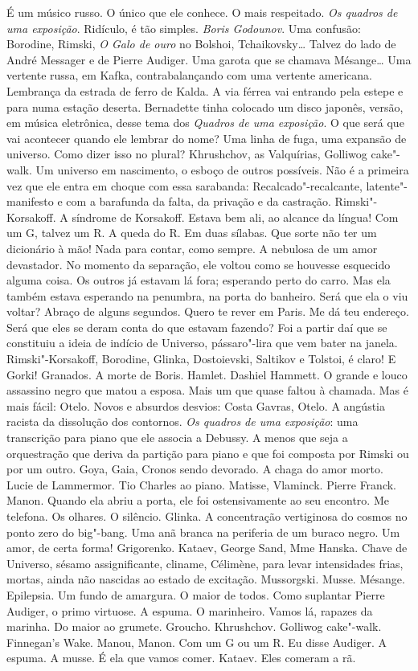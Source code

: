 É um músico russo. O único que ele conhece. O mais respeitado. \emph{Os
quadros de uma exposição}. Ridículo, é tão simples. \emph{Boris
Godounov}. Uma confusão: Borodine, Rimski, \emph{O Galo de ouro} no
Bolshoi, Tchaikovsky\ldots{} Talvez do lado de André Messager e de Pierre
Audiger. Uma garota que se chamava Mésange\ldots{} Uma vertente russa, em
Kafka, contrabalançando com uma vertente americana. Lembrança da estrada
de ferro de Kalda. A via férrea vai entrando pela estepe e para numa
estação deserta. Bernadette tinha colocado um disco japonês, versão, em
música eletrônica, desse tema dos \emph{Quadros de uma exposição}. O que
será que vai acontecer quando ele lembrar do nome? Uma linha de fuga,
uma expansão de universo. Como dizer isso no plural? Khrushchov, as
Valquírias, Golliwog cake"-walk. Um universo em nascimento, o esboço de
outros possíveis. Não é a primeira vez que ele entra em choque com essa
sarabanda: Recalcado"-recalcante, latente"-manifesto e com a barafunda da
falta, da privação e da castração. Rimski"-Korsakoff. A síndrome de
Korsakoff. Estava bem ali, ao alcance da língua! Com um G, talvez um R.
A queda do R. Em duas sílabas. Que sorte não ter um dicionário à mão!
Nada para contar, como sempre. A nebulosa de um amor devastador. No
momento da separação, ele voltou como se houvesse esquecido alguma
coisa. Os outros já estavam lá fora; esperando perto do carro. Mas ela
também estava esperando na penumbra, na porta do banheiro. Será que ela
o viu voltar? Abraço de alguns segundos. Quero te rever em Paris. Me dá
teu endereço. Será que eles se deram conta do que estavam fazendo? Foi a
partir daí que se constituiu a ideia de indício de Universo,
pássaro"-lira que vem bater na janela. Rimski"-Korsakoff, Borodine,
Glinka, Dostoievski, Saltikov e Tolstoi, é claro! E Gorki! Granados. A
morte de Boris. Hamlet. Dashiel Hammett. O grande e louco assassino
negro que matou a esposa. Mais um que quase faltou à chamada. Mas é mais
fácil: Otelo. Novos e absurdos desvios: Costa Gavras, Otelo. A angústia
racista da dissolução dos contornos. \emph{Os quadros de uma exposição}:
uma transcrição para piano que ele associa a Debussy. A menos que seja a
orquestração que deriva da partição para piano e que foi composta por
Rimski ou por um outro. Goya, Gaia, Cronos sendo devorado. A chaga do
amor morto. Lucie de Lammermor. Tio Charles ao piano. Matisse, Vlaminck.
Pierre Franck. Manon. Quando ela abriu a porta, ele foi ostensivamente
ao seu encontro. Me telefona. Os olhares. O silêncio. Glinka. A
concentração vertiginosa do cosmos no ponto zero do big"-bang. Uma anã
branca na periferia de um buraco negro. Um amor, de certa forma!
Grigorenko. Kataev, George Sand, Mme Hanska. Chave de Universo, sésamo
assignificante, cliname, Célimène, para levar intensidades frias,
mortas, ainda não nascidas ao estado de excitação. Mussorgski. Musse.
Mésange. Epilepsia. Um fundo de amargura. O maior de todos. Como
suplantar Pierre Audiger, o primo virtuose. A espuma. O marinheiro.
Vamos lá, rapazes da marinha. Do maior ao grumete. Groucho. Khrushchov.
Golliwog cake"-walk. Finnegan's Wake. Manou, Manon. Com um G ou um R. Eu
disse Audiger. A espuma. A musse. É ela que vamos comer. Kataev. Eles
comeram a rã.

